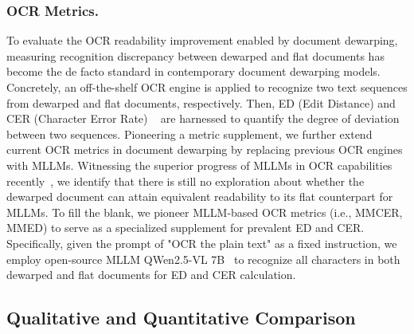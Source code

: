 \subsubsection{OCR Metrics.} 
To evaluate the OCR readability improvement enabled by document dewarping, measuring recognition discrepancy between dewarped and flat documents has become the de facto standard in contemporary document dewarping models. Concretely, an off-the-shelf OCR engine is applied to recognize two text sequences from dewarped and flat documents, respectively. Then, ED (Edit Distance) and CER (Character Error Rate) ~\cite{levenshtein1966binary} are harnessed to quantify the degree of deviation between two sequences. 
Pioneering a metric supplement, we further extend current OCR metrics in document dewarping by replacing previous OCR engines with MLLMs.
Witnessing the superior progress of MLLMs in OCR capabilities recently~\cite{wei2024general, karmanov_eclair_2025, nassar_smoldocling_2025}, we identify that there is still no exploration about whether the dewarped document can attain equivalent readability to its flat counterpart for MLLMs.
To fill the blank, we pioneer MLLM-based OCR metrics (i.e., MMCER, MMED) to serve as a specialized supplement for prevalent ED and CER.
Specifically, given the prompt of "OCR the plain text" as a fixed instruction, we employ open-source MLLM QWen2.5-VL 7B~\cite{bai_2025_qwen25vl} to recognize all characters in both dewarped and flat documents for ED and CER calculation.






\subsection{Qualitative and Quantitative Comparison}
